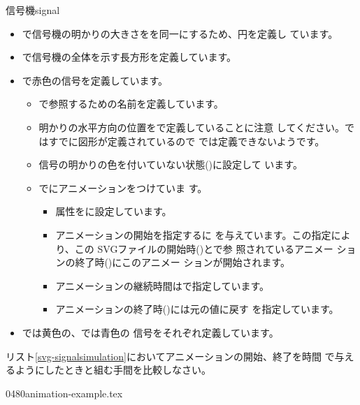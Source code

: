 {信号機}{signal} 
{}
\begin{itemize}
 \item {}で信号機の明かりの大きさをを同一にするため、円を定義し
       ています。
 \item {}で信号機の全体を示す長方形を定義しています。
 \item {}で赤色の信号を定義しています。
\begin{itemize}
 \item {}で参照するための名前を定義しています。
 \item 明かりの水平方向の位置をで定義していることに注意
       してください。ではすでに図形が定義されているので
       では定義できないようです。
 \item 信号の明かりの色を付いていない状態()に設定して
       います。
 \item {}でにアニメーションをつけていま
       す。
\begin{itemize}
 \item 属性をに設定しています。
 \item アニメーションの開始を指定するに
       を与えています。この指定により、この
       SVGファイルの開始時()とで参
       照されているアニメー ションの終了時()にこのアニメー
       ションが開始されます。
 \item アニメーションの継続時間はで指定しています。
 \item アニメーションの終了時()には元の値に戻す
       を指定しています。
\end{itemize}
\end{itemize}
 \item {}では黄色の、では青色の
       信号をそれぞれ定義しています。
\end{itemize}
\begin{Problem}\upshape
リスト\ref{svg-signalsimulation}においてアニメーションの開始、終了を時間
 で与えるようにしたときと組む手間を比較しなさい。
\end{Problem}
\fi
%
 \CH 0480animation-example.tex
